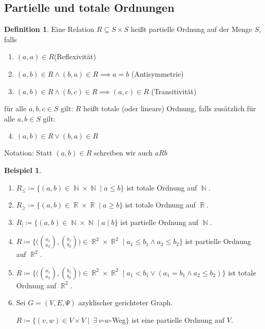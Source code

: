 \documentclass[a4paper,12pt]{article}
\DeclareMathOperator{\N}{\mathbb N}
\DeclareMathOperator{\R}{\mathbb R}
\theoremstyle{definition}
\newtheorem*{example}{Beispiel}
\newtheorem{definition}[axiom]{Definition}
\let\oldexist\exists
\renewcommand{\exists}{\:\oldexist \: }
\begin{document}
	\subsection{Partielle und totale Ordnungen}
	\begin{definition}
		Eine Relation $R \subseteq S \times S$ heißt partielle Ordnung auf der Menge $S$, falls
		\begin{enumerate}[label=(\roman*)]
			\item $(a, a) \in R$\hfill (Reflexivität)
			\item $(a, b) \in R \land (b, a) \in R \implies a = b$ \hfill (Antisymmetrie)
			\item $(a, b) \in R \land (b, c) \in R \implies (a, c) \in R$ \hfill (Transitivität)
		\end{enumerate}
		für alle $a, b, c \in S$ gilt: $R$ heißt totale (oder lineare) Ordnung, falls zusätzlich für alle $a, b \in S$ gilt:
		\begin{enumerate}[label=(\roman*)]
			\setcounter{enumi}{3}
			\item $(a, b) \in R \lor (b, a) \in R$
		\end{enumerate}
	\end{definition}
	Notation: Statt $(a, b) \in R$ schreiben wir auch $aRb$
	\begin{example}
		\begin{enumerate}[label=(\arabic*)]
			\item $R_{\leq} \coloneq \{(a, b) \in \N \times \N \mid a \leq b\}$ ist totale Ordnung auf $\N$.
			\item $R_{\geq} \coloneq \{(a, b) \in \R \times \R \mid a \geq b\}$ ist totale Ordnung auf $\R$.
			\item $R_{\mid} \coloneq \{(a, b) \in \N \times \N \mid a \mid b\}$ ist partielle Ordnung auf $\N$.
			\item $R \coloneq \big\{\big(\binom{a_1}{a_2}, \binom{b_1}{b_2}\big) \in \R^2 \times \R^2 \mid a_1 \leq b_1 \land a_2 \leq b_2\big\}$ ist partielle Ordnung auf $\R^2$. 
			\item $R \coloneq \big\{\big(\binom{a_1}{a_2}, \binom{b_1}{b_2}\big) \in \R^2 \times \R^2 \mid a_1 < b_1 \lor (a_1 = b_1 \land a_2 \leq b_2)\big\}$ ist totale Ordnung auf $\R^2$.
			\item Sei $G = (V, E, \Psi)$ azyklischer gerichteter Graph.
			
			$R \coloneq \{(v, w) \in V \times V \mid \exists v$-$w$-Weg$\}$ ist eine partielle Ordnung auf $V$.
		\end{enumerate}
	\end{example}
\end{document}
